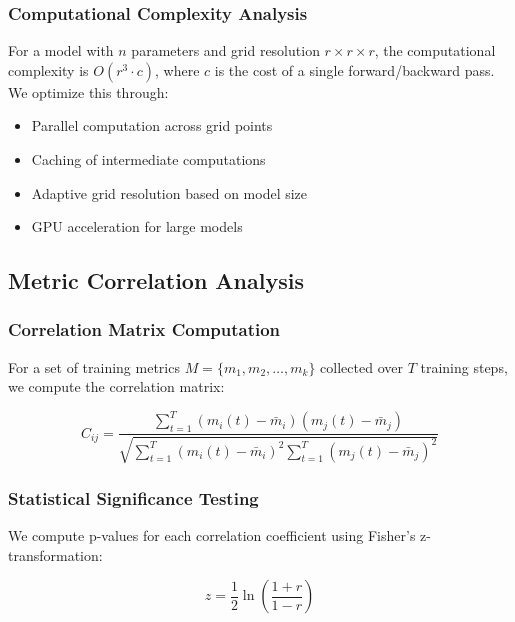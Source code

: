 \documentclass[12pt,a4paper]{article}
\begin{document}
\subsubsection{Computational Complexity Analysis}

For a model with \( n \) parameters and grid resolution \( r \times r \times r \), the computational complexity is \( O(r^3 \cdot c) \), where \( c \) is the cost of a single forward/backward pass. We optimize this through:

\begin{itemize}
    \item Parallel computation across grid points
    \item Caching of intermediate computations
    \item Adaptive grid resolution based on model size
    \item GPU acceleration for large models
\end{itemize}

\subsection{Metric Correlation Analysis}
\label{subsec:correlation}

\subsubsection{Correlation Matrix Computation}

For a set of training metrics \( M = \{m_1, m_2, \dots, m_k\} \) collected over \( T \) training steps, we compute the correlation matrix:

\begin{equation}
    C_{ij} = \frac{\sum_{t=1}^T (m_i(t) - \bar{m}_i)(m_j(t) - \bar{m}_j)}{\sqrt{\sum_{t=1}^T (m_i(t) - \bar{m}_i)^2 \sum_{t=1}^T (m_j(t) - \bar{m}_j)^2}}
\end{equation}

\subsubsection{Statistical Significance Testing}

We compute p-values for each correlation coefficient using Fisher's z-transformation:

\begin{equation}
    z = \frac{1}{2} \ln \left( \frac{1 + r}{1 - r} \right)
\end{equation}
\end{document}
